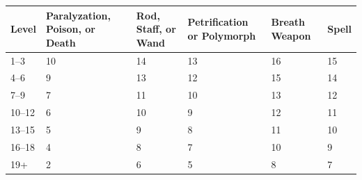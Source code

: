 \noindent
\begin{minipage}{\columnwidth}

\label{priestsaves}
\noindent
\begin{tabular}{|m{}|m{}|m{}|m{}|m{}|m{}|}
\hline
Level	& Paralyzation, Poison, or Death	& Rod, Staff, or Wand	& Petrification or Polymorph	& Breath Weapon	& Spell \\
\hline\hline
\rowcolor[gray]{.9}1--3		& 10	& 14	& 13	& 16	& 15 \\
4--6		& 9		& 13	& 12	& 15	& 14 \\
\rowcolor[gray]{.9}7--9		& 7		& 11	& 10	& 13	& 12 \\
10--12	& 6		& 10	& 9		& 12	& 11 \\
\rowcolor[gray]{.9}13--15	& 5		& 9		& 8		& 11	& 10 \\
16--18	& 4		& 8		& 7		& 10	& 9 \\
\rowcolor[gray]{.9}19+		& 2		& 6		& 5		& 8		& 7 \\
\hline
\end{tabular}

\end{minipage}

